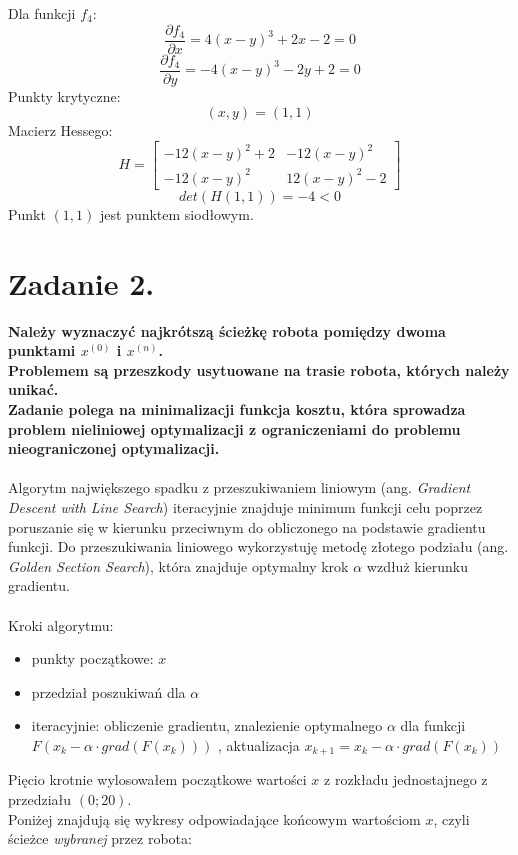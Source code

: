 \documentclass{article}
\begin{document}
Dla funkcji $f_4$:
$$\frac{\partial f_4}{\partial x} = 4(x-y)^3 + 2x - 2 = 0$$
$$\frac{\partial f_4}{\partial y} = -4(x-y)^3 -2y + 2 = 0$$
Punkty krytyczne:
$$(x, y) = (1, 1)$$
Macierz Hessego:
$$H = \begin{bmatrix}
  -12(x-y)^2 + 2 & -12(x-y)^2 \\
  -12(x-y)^2 & 12(x-y)^2-2 
\end{bmatrix}$$
$$det(H(1, 1)) = -4 < 0$$
Punkt $(1, 1)$ jest punktem siodłowym.



\section*{Zadanie 2.}
\textbf{Należy wyznaczyć najkrótszą ścieżkę robota pomiędzy dwoma punktami
$x^{(0)}$ i $x^{(n)}$. \\
Problemem są przeszkody usytuowane na trasie robota, których
należy unikać.\\
Zadanie polega na minimalizacji funkcja kosztu, która sprowadza
problem nieliniowej optymalizacji z ograniczeniami do problemu nieograniczonej
optymalizacji.}
\\\\

Algorytm największego spadku z przeszukiwaniem liniowym (ang. \textit{Gradient Descent with Line Search})
iteracyjnie znajduje minimum funkcji celu poprzez poruszanie się w kierunku przeciwnym do
obliczonego na podstawie gradientu funkcji. Do przeszukiwania liniowego wykorzystuję metodę złotego podziału
(ang. \textit{Golden Section Search}), która znajduje optymalny krok $\alpha$ wzdłuż kierunku gradientu.
\\\\
Kroki algorytmu:
\begin{itemize}
  \item punkty początkowe: $x$\\
  \item przedział poszukiwań dla $\alpha$ \\
  \item iteracyjnie: obliczenie gradientu, znalezienie optymalnego $\alpha$ dla funkcji $F(x_{k} - \alpha \cdot grad(F(x_k)))$
  , aktualizacja $x_{k+1} = x_k - \alpha \cdot grad(F(x_k))$ \\
\end{itemize}

\null\quad
Pięcio krotnie wylosowałem początkowe wartości $x$ z rozkładu jednostajnego z przedziału
$(0; 20)$.\\
\null\quad
Poniżej znajdują się wykresy odpowiadające końcowym wartościom $x$, czyli ścieżce 
\textit{wybranej} przez robota: \\
\end{document}

